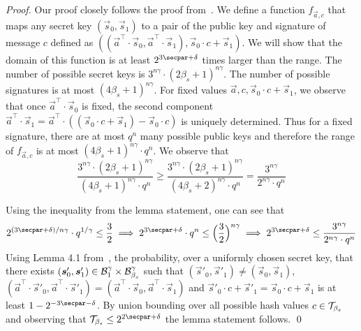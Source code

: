 \begin{proof}
  Our proof closely follows the proof from~{\cite[Lemma 4.9]{TCC:LyuMic08}}.
  We define a function $f_{\vec{a}, c}$ that maps any secret key $(\vec{s}_0, \vec{s}_1)$ to a pair of the public key and signature of message $c$ defined as $((\vec{a}^\intercal\cdot\vec{s}_0,\vec{a}^\intercal\cdot\vec{s}_1), \vec{s}_0\cdot c + \vec{s}_1)$.
  We will show that the domain of this function is at least $2^{3\secpar + \delta}$ times larger than the range.
  The number of possible secret keys is $3^{n\gamma} \cdot (2\beta_s+1)^{n\gamma}$.
  The number of possible signatures is at most $(4\beta_s + 1)^{n\gamma}$.
  For fixed values $\vec{a}, c, \vec{s}_0\cdot c + \vec{s}_1$, we observe that once $\vec{a}^\intercal\cdot\vec{s}_0$ is fixed, the second component $\vec{a}^\intercal\cdot\vec{s}_1 = \vec{a}^\intercal \cdot ((\vec{s}_0\cdot c + \vec{s}_1) - \vec{s}_0 \cdot c)$ is uniquely determined.
  Thus for a fixed signature, there are at most $q^n$ many possible public keys and therefore the range of $f_{\vec{a}, c}$ is at most $(4 \beta_s + 1)^{n\gamma} \cdot q^n$.
  We observe that
  \[\frac{3^{n\gamma} \cdot (2\beta_s+1)^{n\gamma}}{(4 \beta_s + 1)^{n\gamma} \cdot q^n} \geq \frac{3^{n\gamma} \cdot (2\beta_s+1)^{n\gamma}}{(4 \beta_s + 2)^{n\gamma} \cdot q^n}= \frac{3^{n\gamma}}{2^{n\gamma} \cdot q^n}
  \]
  
  Using the inequality from the lemma statement, one can see that
  \[
  2^{(3\secpar+\delta)/n\gamma} \cdot q^{1/\gamma} \leq \frac{3}{2} \implies 2^{3\secpar+\delta} \cdot q^{n} \leq \Bigl(\frac{3}{2}\Bigr)^{n\gamma} 
  \implies 2^{3\secpar+\delta} \leq \frac{3^{n\gamma}}{2^{n\gamma} \cdot q^n} \\
  \]
  Using Lemma 4.1 from~\cite{TCC:LyuMic08}, the probability, over a uniformly chosen secret key, that there exists $(\boldsymbol{s}'_0,\boldsymbol{s}'_1)\in \mathcal{B}_{1}^\gamma \times \mathcal{B}_{\beta_s}^\gamma$ such that $(\vec{s}'_0,\vec{s}'_1)\neq(\vec{s}_0,\vec{s}_1)$, $(\vec{a}^\intercal\cdot\vec{s}'_0,\vec{a}^\intercal\cdot\vec{s}'_1) = (\vec{a}^\intercal\cdot\vec{s}_0,\vec{a}^\intercal\cdot\vec{s}_1)$ and $\vec{s}'_0\cdot c + \vec{s}'_1 = \vec{s}_0\cdot c + \vec{s}_1$ is at least $1-2^{-3\secpar-\delta}$.
  By union bounding over all possible hash values $c \in \mathcal{T}_{\beta_s}$ and observing that $\tern_{\beta_s} \leq 2^{2\secpar + \delta}$ the lemma statement follows. \qed
\end{proof}


